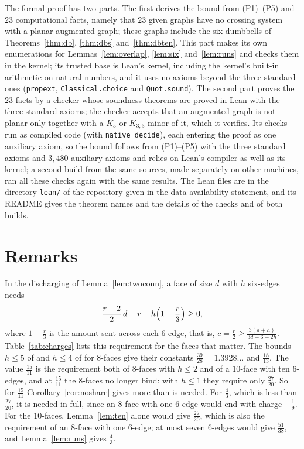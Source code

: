 \documentclass[11pt]{amsart}
\theoremstyle{definition}
\theoremstyle{remark}
\numberwithin{equation}{section}
\newcommand{\file}[1]{\texttt{#1}}
\begin{document}
The formal proof has two parts. The first derives the bound from \mbox{(P1)--(P5)} and $23$ computational facts, namely that $23$ given graphs have no crossing system with a planar augmented graph; these graphs include the six dumbbells of Theorems~\ref{thm:db}, \ref{thm:dbs} and~\ref{thm:dbten}. This part makes its own enumerations for Lemmas~\ref{lem:overlap}, \ref{lem:six} and~\ref{lem:runs} and checks them in the kernel; its trusted base is Lean's kernel, including the kernel's built-in arithmetic on natural numbers, and it uses no axioms beyond the three standard ones (\texttt{propext}, \texttt{Classical.choice} and \texttt{Quot.sound}). The second part proves the $23$ facts by a checker whose soundness theorems are proved in Lean with the three standard axioms; the checker accepts that an augmented graph is not planar only together with a $K_5$ or $K_{3,3}$ minor of it, which it verifies. Its checks run as compiled code (with \texttt{native\_decide}), each entering the proof as one auxiliary axiom, so the bound follows from \mbox{(P1)--(P5)} with the three standard axioms and $3{,}480$ auxiliary axioms and relies on Lean's compiler as well as its kernel; a second build from the same sources, made separately on other machines, ran all these checks again with the same results. The Lean files are in the directory \file{lean/} of the repository given in the data availability statement, and its README gives the theorem names and the details of the checks and of both builds.

\section{Remarks}\label{sec:remarks}

In the discharging of Lemma~\ref{lem:twoconn}, a face of size $d$ with $h$ six-edges needs
\[
\frac{r-2}2\,d-r-h\Bigl(1-\frac r3\Bigr)\ge0,
\]
where $1-\frac r3$ is the amount sent across each $6$-edge, that is, $c=\frac r2\ge\frac{3(d+h)}{3d-6+2h}$. Table~\ref{tab:charges} lists this requirement for the faces that matter. The bounds $h\le5$ of \cite{Xu21} and $h\le4$ of \cite{Sco26} for $8$-faces give their constants $\frac{39}{28}=1.3928\ldots$ and $\frac{18}{13}$. The value $\frac{15}{11}$ is the requirement both of $8$-faces with $h\le2$ and of a $10$-face with ten $6$-edges, and at $\frac{15}{11}$ the $8$-faces no longer bind: with $h\le1$ they require only $\frac{27}{20}$. So for $\frac{15}{11}$ Corollary~\ref{cor:noshare} gives more than is needed. For $\frac43$, which is less than $\frac{27}{20}$, it is needed in full, since an $8$-face with one $6$-edge would end with charge $-\frac19$. For the $10$-faces, Lemma~\ref{lem:ten} alone would give $\frac{27}{20}$, which is also the requirement of an $8$-face with one $6$-edge; at most seven $6$-edges would give $\frac{51}{38}$, and Lemma~\ref{lem:runs} gives $\frac43$.
\end{document}

